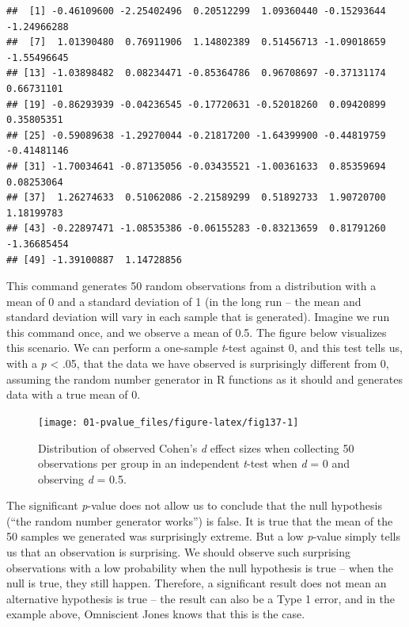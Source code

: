 \documentclass[
  oneside]{krantz}
\begin{document}
\begin{verbatim}
##  [1] -0.46109600 -2.25402496  0.20512299  1.09360440 -0.15293644 -1.24966288
##  [7]  1.01390480  0.76911906  1.14802389  0.51456713 -1.09018659 -1.55496645
## [13] -1.03898482  0.08234471 -0.85364786  0.96708697 -0.37131174  0.66731101
## [19] -0.86293939 -0.04236545 -0.17720631 -0.52018260  0.09420899  0.35805351
## [25] -0.59089638 -1.29270044 -0.21817200 -1.64399900 -0.44819759 -0.41481146
## [31] -1.70034641 -0.87135056 -0.03435521 -1.00361633  0.85359694  0.08253064
## [37]  1.26274633  0.51062086 -2.21589299  0.51892733  1.90720700  1.18199783
## [43] -0.22897471 -1.08535386 -0.06155283 -0.83213659  0.81791260 -1.36685454
## [49] -1.39100887  1.14728856
\end{verbatim}

This command generates 50 random observations from a distribution with a mean of 0 and a standard deviation of 1 (in the long run -- the mean and standard deviation will vary in each sample that is generated). Imagine we run this command once, and we observe a mean of 0.5. The figure below visualizes this scenario. We can perform a one-sample \emph{t}-test against 0, and this test tells us, with a \emph{p} \textless{} .05, that the data we have observed is surprisingly different from 0, assuming the random number generator in R functions as it should and generates data with a true mean of 0.



\begin{figure}

{\centering \texttt{[image: 01-pvalue\_files/figure-latex/fig137-1]} 

}

\caption{Distribution of observed Cohen's \emph{d} effect sizes when collecting 50 observations per group in an independent \emph{t}-test when \emph{d} = 0 and observing \emph{d} = 0.5.}\label{fig:fig137}
\end{figure}

The significant \emph{p}-value does not allow us to conclude that the null hypothesis (``the random number generator works'') is false. It is true that the mean of the 50 samples we generated was surprisingly extreme. But a low \emph{p}-value simply tells us that an observation is surprising. We should observe such surprising observations with a low probability when the null hypothesis is true -- when the null is true, they still happen. Therefore, a significant result does not mean an alternative hypothesis is true -- the result can also be a Type 1 error, and in the example above, Omniscient Jones knows that this is the case.
\end{document}
